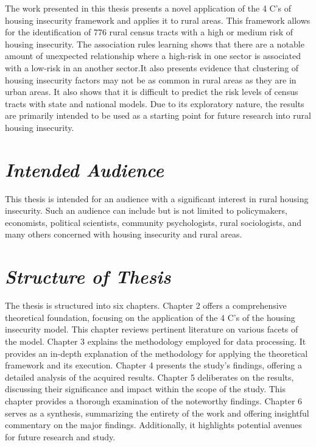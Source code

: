 The work presented in this thesis presents a novel application of the 4 C's of housing insecurity framework and applies it to rural areas. This framework allows for the identification of 776 rural census tracts with a high or medium risk of housing insecurity. The association rules learning shows that there are a notable amount of unexpected relationship where a high-risk in one sector is associated with a low-risk in an another sector.It also presents evidence that clustering of housing insecurity factors may not be as common in rural areas as they are in urban areas. It also shows that it is difficult to predict the risk levels of census tracts with state and national models. Due to its exploratory nature, the results are primarily intended to be used as a starting point for future research into rural housing insecurity. 

\section{\textit{Intended Audience}}
This thesis is intended for an audience with a significant interest in rural housing insecurity. Such an audience can include but is not limited to policymakers, economists, political scientists, community psychologists, rural sociologists, and many others concerned with housing insecurity and rural areas. 

\section{\textit{Structure of Thesis}}
The thesis is structured into six chapters. Chapter 2 offers a comprehensive theoretical foundation, focusing on the application of the 4 C's of the housing insecurity model. This chapter reviews pertinent literature on various facets of the model. Chapter 3 explains the methodology employed for data processing. It provides an in-depth explanation of the methodology for applying the theoretical framework and its execution. Chapter 4 presents the study's findings, offering a detailed analysis of the acquired results. Chapter 5 deliberates on the results, discussing their significance and impact within the scope of the study. This chapter provides a thorough examination of the noteworthy findings. Chapter 6 serves as a synthesis, summarizing the entirety of the work and offering insightful commentary on the major findings. Additionally, it highlights potential avenues for future research and study.

\endinput